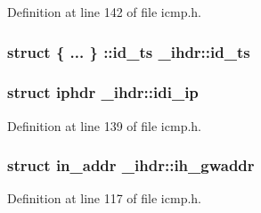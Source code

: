\-Definition at line 142 of file icmp.\-h.

\hypertarget{struct__ihdr_a6a07aaaa06386774c317c24db22830c9}{
\subsubsection[{id\-\_\-ts}]{\setlength{\rightskip}{0pt plus 5cm}struct \{ ... \} \-::{\bf id\-\_\-ts}  {\bf \-\_\-ihdr\-::id\-\_\-ts}}}\label{struct__ihdr_a6a07aaaa06386774c317c24db22830c9}
\hypertarget{struct__ihdr_a01bc79c95db185a97826a8552fca8ada}{
\subsubsection[{idi\-\_\-ip}]{\setlength{\rightskip}{0pt plus 5cm}struct {\bf iphdr} {\bf \-\_\-ihdr\-::idi\-\_\-ip}}}\label{struct__ihdr_a01bc79c95db185a97826a8552fca8ada}


\-Definition at line 139 of file icmp.\-h.

\hypertarget{struct__ihdr_af439f98bdf25360055160d2b6e6157c5}{
\subsubsection[{ih\-\_\-gwaddr}]{\setlength{\rightskip}{0pt plus 5cm}struct in\-\_\-addr {\bf \-\_\-ihdr\-::ih\-\_\-gwaddr}}}\label{struct__ihdr_af439f98bdf25360055160d2b6e6157c5}


\-Definition at line 117 of file icmp.\-h.

